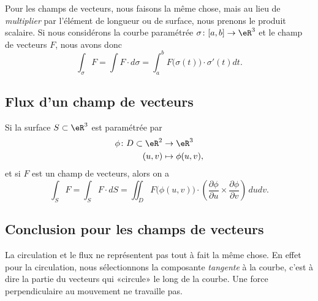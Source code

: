 Pour les champs de vecteurs, nous faisons la même chose, mais au lieu de \emph{multiplier} par l'élément de longueur ou de surface, nous prenons le produit scalaire. Si nous considérons la courbe paramétrée $\sigma\colon \mathopen[ a , b \mathclose]\to \eR^3$ et le champ de vecteurs $F$, nous avons donc
\begin{equation}
    \int_{\sigma}F=\int F\cdot d\sigma=\int_a^bF\big( \sigma(t) \big)\cdot\sigma'(t)dt.
\end{equation}

\subsection{Flux d'un champ de vecteurs}

Si la surface $S\subset\eR^3$ est paramétrée par
\begin{equation}
    \begin{aligned}
        \phi\colon D\subset\eR^2&\to \eR^3 \\
        (u,v)&\mapsto \phi(u,v),
    \end{aligned}
\end{equation}
et si $F$ est un champ de vecteurs, alors on a
\begin{equation}        \label{EqResIntFluxPhi}
    \int_SF=\int_S F\cdot dS=\iint_D F\big( \phi(u,v) \big)\cdot\left( \frac{ \partial \phi }{ \partial u }\times\frac{ \partial \phi }{ \partial v } \right)\,dudv.
\end{equation}

\subsection{Conclusion pour les champs de vecteurs}

La circulation et le flux ne représentent pas tout à fait la même chose. En effet pour la circulation, nous sélectionnons la composante \emph{tangente} à la courbe, c'est à dire la partie du vecteurs qui «circule» le long de la courbe. Une force perpendiculaire au mouvement ne travaille pas.

